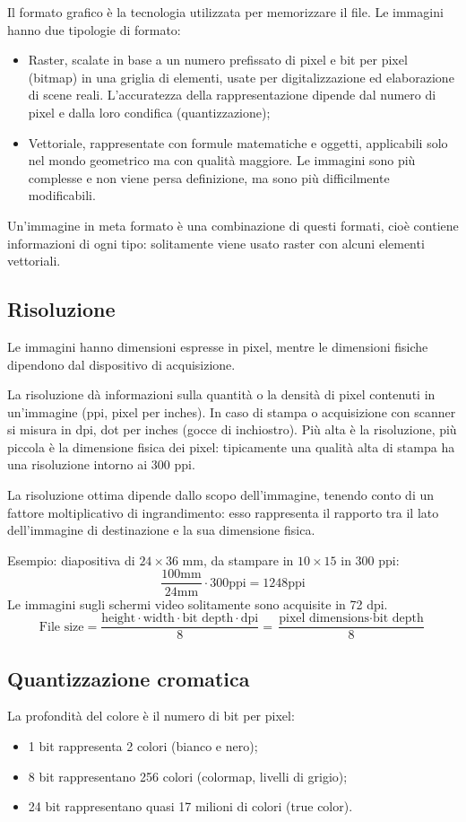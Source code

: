 Il formato grafico è la tecnologia utilizzata per memorizzare il file. Le immagini hanno due tipologie di formato: 
\begin{itemize}
	\item Raster, scalate in base a un numero prefissato di pixel e bit per pixel (bitmap) in una griglia di elementi, usate per digitalizzazione ed elaborazione di scene reali. L'accuratezza della rappresentazione dipende dal numero di pixel e dalla loro condifica (quantizzazione);
	\item Vettoriale, rappresentate con formule matematiche e oggetti, applicabili solo nel mondo geometrico ma con qualità maggiore. Le immagini sono più complesse e non viene persa definizione, ma sono più difficilmente modificabili.
\end{itemize}
Un'immagine in meta formato è una combinazione di questi formati, cioè contiene informazioni di ogni tipo: solitamente viene usato raster con alcuni elementi vettoriali.

\subsection{Risoluzione}
Le immagini hanno dimensioni espresse in pixel, mentre le dimensioni fisiche dipendono dal dispositivo di acquisizione. 

La risoluzione dà informazioni sulla quantità o la densità di pixel contenuti in un'immagine (ppi, pixel per inches). In caso di stampa o acquisizione con scanner si misura in dpi, dot per inches (gocce di inchiostro). Più alta è la risoluzione, più piccola è la dimensione fisica dei pixel: tipicamente una qualità alta di stampa ha una risoluzione intorno ai 300 ppi.

La risoluzione ottima dipende dallo scopo dell'immagine, tenendo conto di un fattore moltiplicativo di ingrandimento: esso rappresenta il rapporto tra il lato dell'immagine di destinazione e la sua dimensione fisica.

Esempio: diapositiva di $24\times36$ mm, da stampare in $10\times15$ in 300 ppi:
$$\frac{100\text{mm}}{24\text{mm}} \cdot 300\text{ppi} = 1248 \text{ppi}$$
Le immagini sugli schermi video solitamente sono acquisite in 72 dpi.
$$ \text{File size} = \frac{\text{height} \cdot \text{width} \cdot \text{bit depth} \cdot \text{dpi}}{8} = \frac{\text{pixel dimensions} \cdot \text{bit depth}}{8}$$

\subsection{Quantizzazione cromatica}
La profondità del colore è il numero di bit per pixel:
\begin{itemize}
	\item 1 bit rappresenta 2 colori (bianco e nero);
	\item 8 bit rappresentano 256 colori (colormap, livelli di grigio);
	\item 24 bit rappresentano quasi 17 milioni di colori (true color).
\end{itemize}

